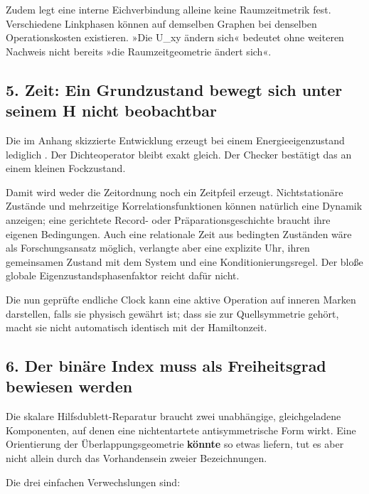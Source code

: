 Zudem legt eine interne Eichverbindung alleine keine Raumzeitmetrik
fest. Verschiedene Linkphasen können auf demselben Graphen bei denselben
Operationskosten existieren. »Die U\_xy ändern sich« bedeutet ohne
weiteren Nachweis nicht bereits »die Raumzeitgeometrie ändert sich«.

\subsection{5. Zeit: Ein Grundzustand bewegt sich unter seinem H nicht
beobachtbar}\label{zeit-ein-grundzustand-bewegt-sich-unter-seinem-h-nicht-beobachtbar}

Die im Anhang skizzierte Entwicklung  erzeugt
bei einem Energieeigenzustand lediglich . Der
Dichteoperator bleibt exakt gleich. Der Checker bestätigt das an einem
kleinen Fockzustand.

Damit wird weder die Zeitordnung noch ein Zeitpfeil erzeugt.
Nichtstationäre Zustände und mehrzeitige Korrelationsfunktionen können
natürlich eine Dynamik anzeigen; eine gerichtete Record- oder
Präparationsgeschichte braucht ihre eigenen Bedingungen. Auch eine
relationale Zeit aus bedingten Zuständen wäre als Forschungsansatz
möglich, verlangte aber eine explizite Uhr, ihren gemeinsamen Zustand
mit dem System und eine Konditionierungsregel. Der bloße globale
Eigenzustandsphasenfaktor reicht dafür nicht.

Die nun geprüfte endliche Clock kann eine aktive Operation auf inneren
Marken darstellen, falls sie physisch gewährt ist; dass sie zur
Quellsymmetrie gehört, macht sie nicht automatisch identisch mit der
Hamiltonzeit.

\subsection{6. Der binäre Index muss als Freiheitsgrad bewiesen
werden}\label{der-binuxe4re-index-muss-als-freiheitsgrad-bewiesen-werden}

Die skalare Hilfsdublett-Reparatur braucht zwei unabhängige,
gleichgeladene Komponenten, auf denen eine nichtentartete
antisymmetrische Form wirkt. Eine Orientierung der Überlappungsgeometrie
\textbf{könnte} so etwas liefern, tut es aber nicht allein durch das
Vorhandensein zweier Bezeichnungen.

Die drei einfachen Verwechslungen sind:

